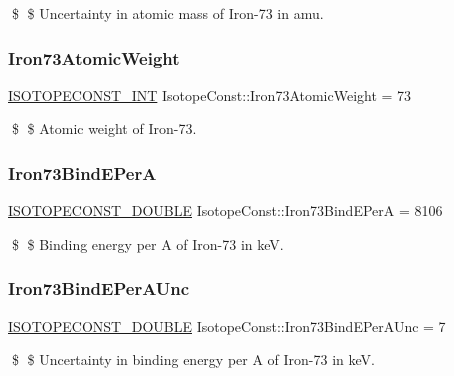 \$ \$ Uncertainty in atomic mass of Iron-\/73 in amu. \mbox{\label{group___isotope_const-_iron-_fe73_ga7e462052a0585ef658707a9bd8ab5ae2}} 
\subsubsection{\texorpdfstring{Iron73\+Atomic\+Weight}{Iron73AtomicWeight}}
{\footnotesize\ttfamily \mbox{\hyperlink{group___isotope_const-_macros_ga5f18360b3e99483a35c32d789e62621c}{I\+S\+O\+T\+O\+P\+E\+C\+O\+N\+S\+T\+\_\+\+I\+NT}} Isotope\+Const\+::\+Iron73\+Atomic\+Weight = 73}

\$ \$ Atomic weight of Iron-\/73. \mbox{\label{group___isotope_const-_iron-_fe73_ga1a0b5ba4ecd266c050196740b7f2c9e9}} 
\subsubsection{\texorpdfstring{Iron73\+Bind\+E\+PerA}{Iron73BindEPerA}}
{\footnotesize\ttfamily \mbox{\hyperlink{group___isotope_const-_macros_ga8f45a7272ce02c0b4c65c44636ed719a}{I\+S\+O\+T\+O\+P\+E\+C\+O\+N\+S\+T\+\_\+\+D\+O\+U\+B\+LE}} Isotope\+Const\+::\+Iron73\+Bind\+E\+PerA = 8106}

\$ \$ Binding energy per A of Iron-\/73 in keV. \mbox{\label{group___isotope_const-_iron-_fe73_gad257b498c4d95e638101efe3693dcb41}} 
\subsubsection{\texorpdfstring{Iron73\+Bind\+E\+Per\+A\+Unc}{Iron73BindEPerAUnc}}
{\footnotesize\ttfamily \mbox{\hyperlink{group___isotope_const-_macros_ga8f45a7272ce02c0b4c65c44636ed719a}{I\+S\+O\+T\+O\+P\+E\+C\+O\+N\+S\+T\+\_\+\+D\+O\+U\+B\+LE}} Isotope\+Const\+::\+Iron73\+Bind\+E\+Per\+A\+Unc = 7}

\$ \$ Uncertainty in binding energy per A of Iron-\/73 in keV. \mbox{\label{group___isotope_const-_iron-_fe73_ga848e64a90a0d5ce74b23032c29a819b0}} 
